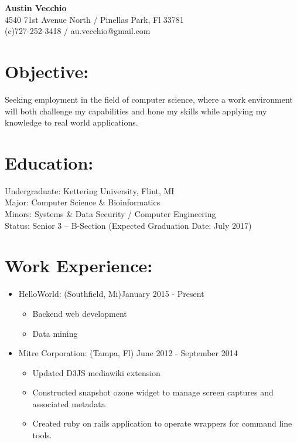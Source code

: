 \documentclass{res}
\begin{document}
\begin{center}
\LARGE{\textbf{Austin Vecchio}}\\
\normalsize{
4540 71st Avenue North / Pinellas Park, Fl 33781\\
(c)727-252-3418 / au.vecchio@gmail.com
}
\end{center}

\section{Objective:}
Seeking employment in the field of computer science, where a work environment will both challenge my capabilities and hone my skills while applying my knowledge to real world applications.\\

\section{Education:}
Undergraduate: Kettering University, Flint, MI\\
Major: Computer Science \& Bioinformatics\\
Minors: Systems \& Data Security / Computer Engineering\\
Status: Senior 3 – B-Section (Expected Graduation Date: July 2017)\\

\section{Work Experience:}
\begin{itemize}
\item HelloWorld: (Southfield, Mi)\hfill January 2015 - Present
\begin{itemize}[label=$\circ$]
\item Backend web development
\item Data mining
\end{itemize}
\item Mitre Corporation: (Tampa, Fl) \hfill June 2012 - September 2014
\begin{itemize}[label=$\circ$]
\item Updated D3JS mediawiki extension
\item Constructed snapshot ozone widget to manage screen captures and associated metadata
\item Created ruby on rails application to operate wrappers for command line tools.
\end{itemize}
\end{itemize}
\end{document}
